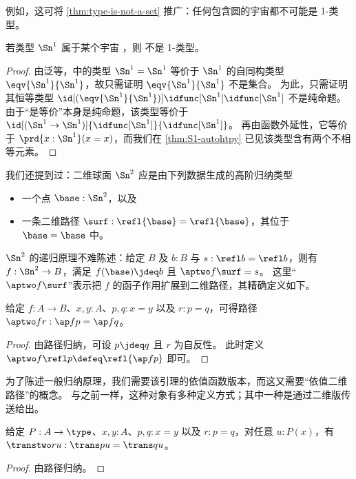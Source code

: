 例如，这可将 \cref{thm:type-is-not-a-set} 推广：任何包含圆的宇宙都不可能是 1-类型。

\begin{cor}
  若类型 $\Sn^1$ 属于某个宇宙 \type，则 \type 不是 1-类型。
\end{cor}
\begin{proof}
  由泛等，\type 中的类型 $\Sn^1=\Sn^1$ 等价于 $\Sn^1$ 的自同构类型 $\eqv{\Sn^1}{\Sn^1}$，故只需证明 $\eqv{\Sn^1}{\Sn^1}$ 不是集合。
  为此，只需证明其恒等类型 $\id[(\eqv{\Sn^1}{\Sn^1})]{\idfunc[\Sn^1]}{\idfunc[\Sn^1]}$ 不是纯命题。
  由于“是等价”本身是纯命题，该类型等价于 $\id[(\Sn^1\to\Sn^1)]{\idfunc[\Sn^1]}{\idfunc[\Sn^1]}$。
  再由函数外延性，它等价于 $\prd{x:\Sn^1} (x=x)$，而我们在 \cref{thm:S1-autohtpy} 已见该类型含有两个不相等元素。
\end{proof}

%

%
%
我们还提到过：二维球面 $\Sn^2$ 应是由下列数据生成的高阶归纳类型
\begin{itemize}
\item 一个点 $\base:\Sn^2$，以及
\item 一条二维路径 $\surf:\refl{\base} = \refl{\base}$，其位于 ${\base=\base}$ 中。
\end{itemize}
%
$\Sn^2$ 的递归原理不难陈述：给定 $B$ 及 $b:B$ 与 $s:\refl b = \refl b$，则有 $f:\Sn^2\to B$，满足 $f(\base)\jdeq b$ 且 $\aptwo f \surf = s$。
这里“$\aptwo f \surf$”表示把 $f$ 的函子作用扩展到二维路径，其精确定义如下。

\begin{lem}\label{thm:ap2}
  给定 $f:A\to B$、$x,y:A$、$p,q:x=y$ 以及 $r:p=q$，可得路径 $\aptwo f r : \ap f p = \ap f q$。
\end{lem}
\begin{proof}
  由路径归纳，可设 $p\jdeq q$ 且 $r$ 为自反性。
  此时定义 $\aptwo f {\refl p} \defeq \refl{\ap f p}$ 即可。
\end{proof}

为了陈述一般归纳原理，我们需要该引理的依值函数版本，而这又需要“依值二维路径”的概念。
与之前一样，这种对象有多种定义方式；其中一种是通过二维版传送给出。

\begin{lem}\label{thm:transport2}
  给定 $P:A\to\type$、$x,y:A$、$p,q:x=y$ 以及 $r:p=q$，对任意 $u:P(x)$，有 $\transtwo r u : \trans p u = \trans q u$。
\end{lem}
\begin{proof}
  由路径归纳。
\end{proof}

